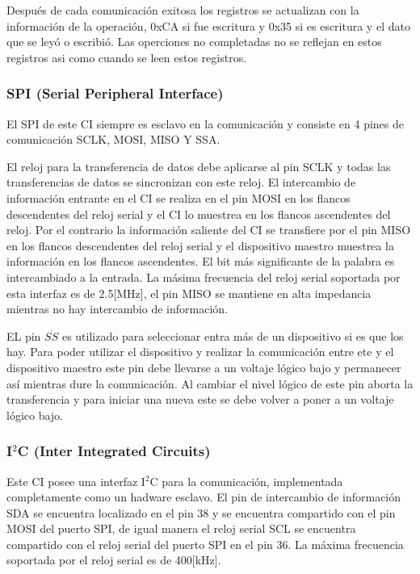 \documentclass[letterpaper,12pt,oneside]{book}
\begin{document}
			Después de cada comunicación exitosa los registros se actualizan con la información de la operación, 0xCA si fue escritura y 0x35 si es escritura y el dato que se leyó o escribió. Las operciones no completadas no se reflejan en estos registros asi como cuando se leen estos registros.

			\subsubsection{SPI (Serial Peripheral Interface)}
			El SPI de este CI siempre es esclavo en la comunicación y consiste en 4 pines de comunicación SCLK, MOSI, MISO Y SSA.

			El reloj para la transferencia de datos debe aplicarse al pin SCLK y todas las transferencias de datos se sincronizan con este reloj. El intercambio de información entrante en el CI se realiza en el pin MOSI en los flancos descendentes del reloj serial y el CI lo muestrea en los flancos ascendentes del reloj. Por el contrario la información saliente del CI se transfiere por el pin MISO en los flancos descendentes del reloj serial y el dispositivo maestro muestrea la información en los flancos ascendentes. El bit más significante de la palabra es intercambiado a la entrada. La másima frecuencia del reloj serial soportada por esta interfaz es de 2.5[MHz], el pin MISO se mantiene en alta impedancia mientras no hay intercambio de información.

			EL pin $\overline{SS}$ es utilizado para seleccionar entra más de un dispositivo si es que los hay. Para poder utilizar el dispositivo y realizar la comunicación entre ete y el dispositivo maestro este pin debe llevarse a un voltaje lógico bajo y permanecer así mientras dure la comunicación. Al cambiar el nivel lógico de este pin aborta la transferencia y para iniciar una nueva este se debe volver a poner a un voltaje lógico bajo.

			\subsubsection{I$^2$C (Inter Integrated Circuits)}
			Este CI posee una interfaz I$^2$C para la comunicación, implementada completamente como un hadware esclavo. El pin de intercambio de información SDA se encuentra localizado en el pin 38 y se encuentra compartido con el pin MOSI del puerto SPI, de igual manera el reloj serial SCL se encuentra compartido con el reloj serial del puerto SPI en el pin 36. La máxima frecuencia soportada por el reloj serial es de 400[kHz].
\end{document}
